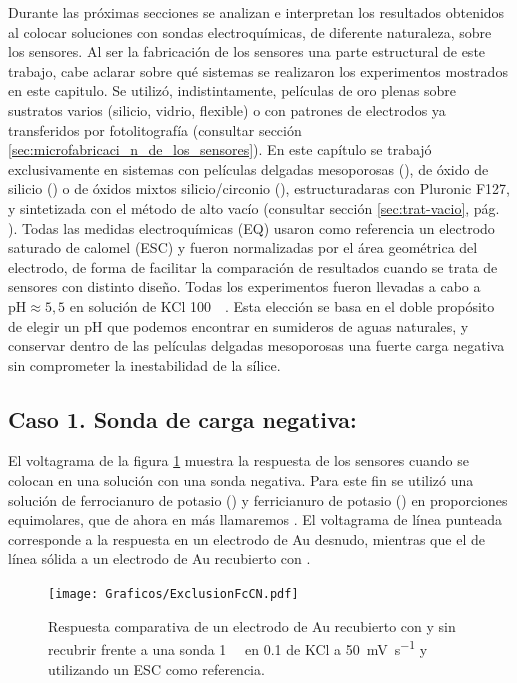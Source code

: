 	 Durante las próximas secciones se analizan e interpretan los resultados obtenidos al colocar soluciones con sondas electroquímicas, de diferente naturaleza, sobre los sensores. Al ser la fabricación de los sensores una parte estructural de este trabajo, cabe aclarar sobre qué sistemas se realizaron los experimentos mostrados en este capitulo. Se utilizó, indistintamente, películas de oro plenas sobre sustratos varios (silicio, vidrio, flexible)  o con patrones de electrodos ya transferidos por fotolitografía (consultar sección \ref{sec:microfabricaci_n_de_los_sensores}). En este capítulo se trabajó exclusivamente en sistemas con películas delgadas mesoporosas (\pdm), de óxido de silicio (\pdmF) o de óxidos mixtos silicio/circonio (\pdmZ), estructuradaras con Pluronic F127, y sintetizada con el método de alto vacío (consultar sección \ref{sec:trat-vacio}, pág. \pageref{sec:trat-vacio}). Todas las medidas electroquímicas (EQ) usaron como referencia un electrodo saturado de calomel (ESC) y fueron normalizadas por el área geométrica del electrodo, de forma de facilitar la comparación de resultados cuando se trata de sensores con distinto diseño. Todas los experimentos fueron llevadas a cabo a $\text{pH}\approx5,5$ en solución de KCl \SI{100}{\milli\Molar}. Esta elección se basa en el doble propósito de elegir un pH que podemos encontrar en sumideros de aguas naturales, y conservar dentro de las películas delgadas mesoporosas una fuerte carga negativa sin comprometer la inestabilidad de la sílice.

	\subsection{Caso 1. Sonda de carga negativa: \texorpdfstring{\ferroferri}{ferroferri}}

	 El voltagrama de la figura \ref{fig:exclusion_vs_Au} muestra la respuesta de los sensores cuando se colocan en una solución con una sonda negativa. Para este fin se utilizó una solución de ferrocianuro de potasio (\ferroCompleto) y ferricianuro de potasio (\ferriCompleto) en proporciones equimolares, que de ahora en más llamaremos \fe. El voltagrama de línea punteada corresponde a la respuesta en un electrodo de Au desnudo, mientras que el de línea sólida a un electrodo de Au recubierto con \pdmF.
	
			\begin{figure}[ht]
				\centering
		 	    \texttt{[image: Graficos/ExclusionFcCN.pdf]}
		        \caption[Exclusión electrostática en \pdmF]{Respuesta comparativa de un electrodo de Au recubierto con \pdmF\space y sin recubrir frente a una sonda \fe\space \SI{1}{\milli\Molar} en \SI{0.1}{\Molar} de KCl a \SI{50}{\milli\volt\per\second} y utilizando un ESC como referencia.}
		        \label{fig:exclusion_vs_Au}
		      	\end{figure}
	
